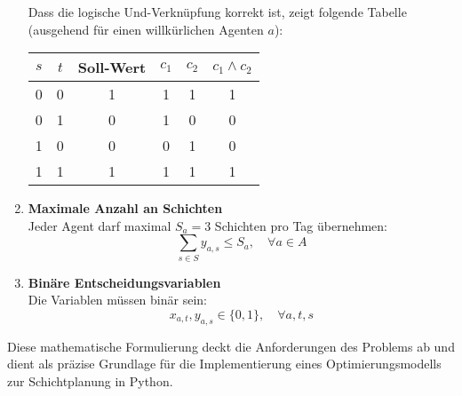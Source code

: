 \begin{enumerate}
        Dass die logische Und-Verknüpfung korrekt ist, zeigt folgende Tabelle (ausgehend für einen willkürlichen Agenten $a$):
        \begin{center}
            \begin{tabular}{|c|c|c||c|c||c|}
                \hline
                $s$ & $t$ & Soll-Wert & $c_1$ & $c_2$ & $c_1 \land c_2$ \\
                \hline
                \hline
                0 & 0 & 1 & 1 & 1 & 1 \\
                \hline
                0 & 1 & 0 & 1 & 0 & 0 \\
                \hline
                1 & 0 & 0 & 0 & 1 & 0 \\
                \hline
                1 & 1 & 1 & 1 & 1 & 1 \\
                \hline
            \end{tabular}
        \end{center}

    \item \textbf{Maximale Anzahl an Schichten}\\
        Jeder Agent darf maximal $S_a = 3$ Schichten pro Tag übernehmen:
        $$\sum_{s \in S} y_{a,s} \leq S_a,\quad\forall a\in A$$
    \item \textbf{Binäre Entscheidungsvariablen}\\
        Die Variablen müssen binär sein:
        $$x_{a,t}, y_{a,s} \in \{0,1\},\quad\forall a,t,s$$
\end{enumerate}

Diese mathematische Formulierung deckt die Anforderungen des Problems ab und dient als präzise Grundlage für die Implementierung eines Optimierungsmodells zur Schichtplanung in Python.
